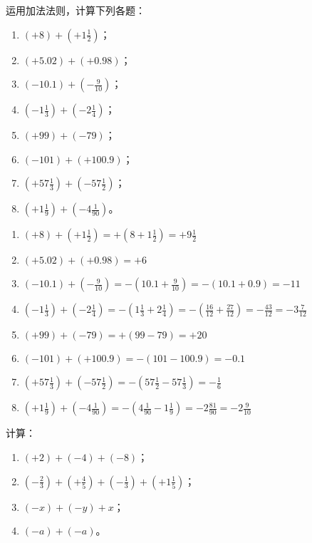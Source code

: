 \begin{example}
	运用加法法则，计算下列各题：
	\begin{multicols}{2}
		\begin{enumerate}
			\item $(+8)+\left(+1\frac{1}{2}\right)$；
			\item $(+5.02)+\left(+0.98\right)$；
			\item $(-10.1)+\left(-\frac{9}{10}\right)$；
			\item $\left(-1\frac{1}{3}\right)+\left(-2\frac{1}{4}\right)$；
			\item $(+99)+(-79)$；
			\item $(-101)+(+100.9)$；
			\item $(+57\frac{1}{3})+\left(-57\frac{1}{2}\right)$；
			\item $\left(+1\frac{1}{9}\right)+\left(-4\frac{1}{90}\right)$。
		\end{enumerate}
	\end{multicols}
\end{example}    

\begin{solution}
	\begin{enumerate}
		\item $(+8)+\left(+1\frac{1}{2}\right)=+\left(8+1\frac{1}{2}\right)=+9\frac{1}{2}$
		\item $(+5.02)+\left(+0.98\right)=+6$
		\item $(-10.1)+\left(-\frac{9}{10}\right)=-\left(10.1+\frac{9}{10}\right)=-(10.1+0.9)=-11$
		\item $\left(-1\frac{1}{3}\right)+\left(-2\frac{1}{4}\right)=-\left(1\frac{1}{3}+2\frac{1}{4}\right)=-\left(\frac{16}{12}+\frac{27}{12}\right)=-\frac{43}{12}=-3\frac{7}{12}$
		\item $(+99)+(-79)=+(99-79)=+20$
		\item $(-101)+(+100.9)=-(101-100.9)=-0.1$
		\item $(+57\frac{1}{3})+\left(-57\frac{1}{2}\right)=-\left(57\frac{1}{2}-57\frac{1}{3}\right)=-\frac{1}{6}$
		\item $\left(+1\frac{1}{9}\right)+\left(-4\frac{1}{90}\right)=-\left(4\frac{1}{90}-1\frac{1}{9}\right)=-2\frac{81}{90}=-2\frac{9}{10}$
		
	\end{enumerate}
	
\end{solution}

\begin{example}
	计算：
	\begin{enumerate}
		\item $(+2)+(-4)+(-8)$；
		\item $\left(-\frac{2}{3}\right)+\left(+\frac{4}{5}\right)+\left(-\frac{1}{3}\right)+\left(+1\frac{1}{5}\right)$；
		\item $(-x)+(-y)+x$；
		\item $(-a)+(-a)$。
	\end{enumerate}
\end{example}

